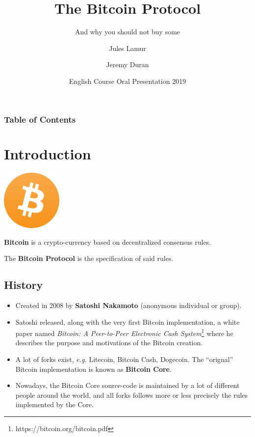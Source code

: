 \documentclass{beamer}
\title{The Bitcoin Protocol}
\subtitle{And why you should not buy some}
\author[Lamur, Duran]{Jules Lamur\inst{1} \and Jeremy Duran\inst{1}}
\institute
{
    \inst{1}
    Université de Toulouse 3 --- Paul Sabatier
}
\date[2019]{English Course Oral Presentation 2019}
\begin{document}
\frame{\titlepage}

\begin{frame}
    \frametitle{Table of Contents}
    \tableofcontents[hidesubsections]
\end{frame}

\section{Introduction}

\begin{frame}
    \begin{center}
        \includegraphics[height=3cm]{bitcoin_logo.png}
    \end{center}

    \textbf{Bitcoin} is a crypto-currency based on decentralized consensus rules.
    \pause

    The \textbf{Bitcoin Protocol} is the specification of said rules.
\end{frame}

\subsection{History}

\begin{frame}
    \begin{itemize}
        \item Created in 2008 by \textbf{Satoshi Nakamoto} (anonymous
            individual or group).

        \item Satoshi released, along with the very first Bitcoin
            implementation, a white paper named \textit{Bitcoin: A Peer-to-Peer
            Electronic Cash System}\footnote{https://bitcoin.org/bitcoin.pdf}
            where he describes the purpose and motivations of the Bitcoin
            creation.

        \item A lot of forks exist, \textit{e.g.} Litecoin, Bitcoin Cash,
            Dogecoin. The ``orignal'' Bitcoin implementation is known as
            \textbf{Bitcoin Core}.

        \item Nowadays, the Bitcoin Core source-code is maintained by a lot of
            different people around the world, and all forks follows more or
            less precisely the rules implemented by the Core.
    \end{itemize}
\end{frame}
\end{document}
